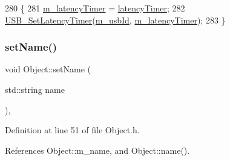 \begin{DoxyCode}
280                                                     \{
281     \hyperlink{classUsbFTInterface_a0eefe6f2cee132da70176562cd126718}{m\_latencyTimer} = \hyperlink{classUsbFTInterface_a4fa70ce4a4cd4f8f01cdeb4835f11276}{latencyTimer};
282     \hyperlink{LALUsbML_8h_a1a6965b64c7de773855cbdeaf2a62a27}{USB\_SetLatencyTimer}(\hyperlink{classUsbFTInterface_a91df5c0547e8be460bc087e27afe05aa}{m\_usbId}, \hyperlink{classUsbFTInterface_a0eefe6f2cee132da70176562cd126718}{m\_latencyTimer});
283   \}
\end{DoxyCode}
\mbox{\label{classObject_ae30fea75683c2d149b6b6d17c09ecd0c}} 
\subsubsection{\texorpdfstring{set\+Name()}{setName()}}
{\footnotesize\ttfamily void Object\+::set\+Name (\begin{DoxyParamCaption}\item[{std\+::string}]{name }\end{DoxyParamCaption})\hspace{0.3cm}{\ttfamily [inline]}, {\ttfamily [inherited]}}



Definition at line 51 of file Object.\+h.



References Object\+::m\+\_\+name, and Object\+::name().



